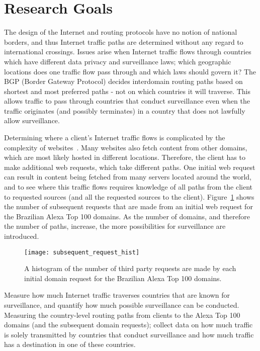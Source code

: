 \section{Research Goals}
\label{problem}

The design of the Internet and routing protocols have no notion of national borders, and thus Internet traffic paths are determined without any regard to international crossings.  Issues arise when Internet traffic flows through countries which have different data privacy and surveillance laws; which geographic locations does one traffic flow pass through and which laws should govern it?  The BGP (Border Gateway Protocol) decides interdomain routing paths based on shortest and most preferred paths - not on which countries it will traverse.  This allows traffic to pass through countries that conduct surveillance even when the traffic originates (and possibly terminates) in a country that does not lawfully allow surveillance.  

Determining where a client's Internet traffic flows is complicated by the complexity of websites~\cite{butkiewicz2011understanding}.  Many websites also fetch content from other domains, which are most likely hosted in different locations.  Therefore, the client has to make additional web requests, which take different paths.  One initial web request can result in content being fetched from many servers located around the world, and to see where this traffic flows requires knowledge of all paths from the client to requested sources (and all the requested sources to the client).  Figure~\ref{fig:domains} shows the number of subsequent requests that are made from an initial web request for the Brazilian Alexa Top 100 domains.  As the number of domains, and therefore the number of paths, increase, the more possibilities for surveillance are introduced.

\begin{figure}
\centering
\texttt{[image: subsequent\_request\_hist]}
\caption{A histogram of the number of third party requests are made by each initial domain request for the Brazilian Alexa Top 100 domains.}
\label{fig:domains}
\end{figure}

\begin{thm}
Measure how much Internet traffic traverses countries that are known for surveillance, and quantify how much possible surveillance can be conducted.  Measuring the country-level routing paths from clients to the Alexa Top 100 domains (and the subsequent domain requests); collect data on how much traffic is solely transmitted by countries that conduct surveillance and how much traffic has a destination in one of these countries.
\end{thm}

